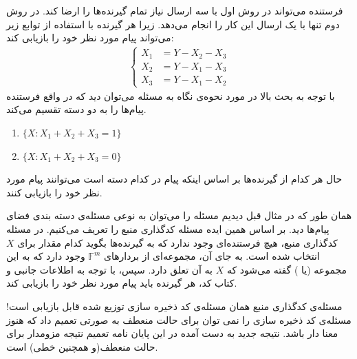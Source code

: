 \begin{example}
\begin{minipage}{0.5\textwidth}
	\end{minipage}
	\newline
		فرستنده می‌تواند در روش اول با سه ارسال نیاز تمام گیرنده‌ها را ارضا کند. در روش دوم تنها با یک ارسال این کار را انجام می‌دهد. زیرا هر گیرنده با استفاده از توابع زیر می‌تواند پیام مورد نظر خود را بازیابی کند:
	\begin{align*}
		\begin{cases}
				X_1 &= Y - X_2 - X_3 \\
				X_2 &= Y - X_1 - X_3  \\
				X_3 &= Y - X_1 - X_2  
			\end{cases}   
	\end{align*}
	با توجه به بحث بالا در مورد نحوه‌ی نگاه به مسئله می‌توان دید که در واقع فرستنده پیام‌ها را به دو دسته تقسیم می‌کند.
	\begin{latin}

		\begin{enumerate}
			\centering
			\item $\{X: X_1 + X_2 + X_3 = 1\}$
			\item $\{X: X_1 + X_2 + X_3 = 0\}$
		\end{enumerate}
	\end{latin}
	حال هر کدام از گیرنده‌ها بر اساس اینکه پیام در کدام دسته است می‌توانند پیام مورد نظر خود را بازیابی کنند.
\end{example}

همان طور که در مثال قبل دیدیم مسئله 
\icod
 را می‌توان به نوعی مسئله‌ی دسته بندی فضای پیام‌ها دید. بر اساس همین ایده مسئله کدگذاری منبع را تعریف می‌کنیم. در مسئله کدگذاری منبع، هیچ فرستنده‌ای وجود ندارد که به گیرنده‌ها بگوید کدام مقدار برای $X$ انتخاب شده است. به جای آن، مجموعه‌ای از بردارهای
  $\mathbb{F}^m$
   وجود دارد که به این مجموعه
 (یا 
 ) گفته می‌شود که $X$ به آن تعلق دارد. سپس، با توجه به اطلاعات جانبی و کتاب کد، هر گیرنده باید پیام مورد نظر خود را بازیابی کند.
\begin{مشاهده}
	مسئله‌ی کدگذاری منبع همان مسئله‌ی کد ذخیره سازی توزیع شده قابل بازیابی است! مسئله‌ی کد ذخیره سازی را نمی توان برای حالت منعطف به صورتی تعمیم داد که هنوز معنا دار باشد. نتیجه جدید به دست آمده در این پایان نامه تعمیم نتیجه مزومدار برای حالت منعطف(و همچنین خطی) است.
\end{مشاهده}

